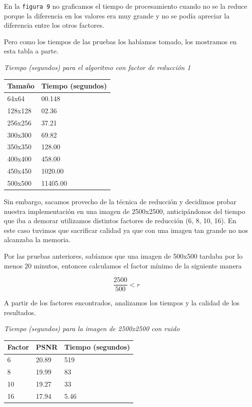 \documentclass[a4paper]{article}
\begin{document}
En la \texttt{figura 9} no graficamos el tiempo de procesamiento cuando no se la reduce porque la diferencia en los valores era muy grande y no se podía apreciar la diferencia entre los otros factores.

Pero como los tiempos de las pruebas los habíamos tomado, los mostramos en esta tabla a parte.

\vspace{2em}
\textit{Tiempo (segundos) para el algoritmo con factor de reducción 1}
\begin{center}
\begin{tabular}{|l|l|}
  \hline
  Tamaño & Tiempo (segundos) \\
  \hline
64x64 & 00.148 \\
128x128 & 02.36  \\
256x256 & 37.21 \\
300x300 & 69.82 \\
350x350 & 128.00 \\ 
400x400 & 458.00 \\
450x450 & 1020.00 \\
500x500 & 11405.00 \\
\hline
\end{tabular}
\end{center} 
\vspace{1em}

Sin embargo, sacamos provecho de la técnica de reducción y decidimos probar nuestra implementación en una imagen de 2500x2500, anticipándonos del tiempo que iba a demorar utilizamos distintos factores de reducción (6, 8, 10, 16). 
En este caso tuvimos que sacrificar calidad ya que con una imagen tan grande no nos alcanzaba la memoria.

Por las pruebas anteriores, sabíamos que una imagen de 500x500 tardaba por lo menos 20 minutos, entonces calculamos el factor mínimo de la siguiente manera

\begin{equation} \frac{2500}{500} < r\end{equation}

A partir de los factores encontrados, analizamos los tiempos y la calidad de los resultados.

\vspace{2em}
\textit{Tiempo (segundos) para la imagen de 2500x2500 con ruido}
\begin{center}
\begin{tabular}{|l|l|l|}
  \hline
  Factor & PSNR & Tiempo (segundos) \\
  \hline
6  & 20.89 & 519 \\
8  & 19.99 & 83 \\
10 & 19.27 & 33 \\
16 & 17.94 & 5.46 \\
\hline
\end{tabular}
\end{center} 
\vspace{1em}
\end{document}
